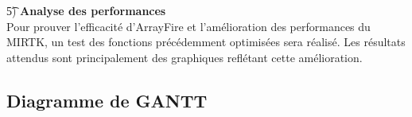 \documentclass[10pt]{report}
\begin{document}
	\t 5) \textbf{Analyse des performances} \\
	Pour prouver l'efficacité d'ArrayFire et l'amélioration des performances du MIRTK, un test des fonctions précédemment optimisées sera réalisé. Les résultats attendus sont principalement des graphiques reflétant cette amélioration.
	\subsection{Diagramme de GANTT}
\end{document}
